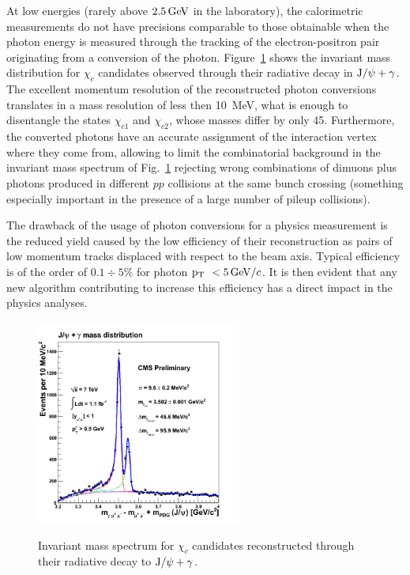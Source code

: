 \documentclass[a4paper]{jpconf}
\def \Chione {\chi_{c1}}
\def \Chitwo {\chi_{c2}}
\def \JPsi{\rm J/\psi}
\def \cPgg{\gamma}
\def \pt{$\p_{\rm T}$~}
\begin{document}
At  low energies (rarely above 
$2.5{\rm \, GeV}$ in the laboratory), the calorimetric
measurements do not have precisions comparable to those obtainable
when the photon energy is measured through the tracking of the 
electron-positron pair originating from a conversion of the photon.
Figure~\ref{fig:chic} shows the invariant mass distribution for $\chi_c$ candidates
observed through their radiative decay in $\JPsi + \cPgg$. The excellent momentum resolution of the reconstructed photon conversions translates in a mass resolution of less then 10~MeV, what is enough to disentangle  the states $\Chione$ and $\Chitwo$, whose masses differ by only 45\MeV.
%
Furthermore, the  converted photons have an accurate assignment of the interaction vertex where they come from, allowing  to limit the combinatorial background in the invariant mass spectrum of Fig.~\ref{fig:chic}
rejecting wrong combinations of  dimuons  plus  photons produced in different $pp$ collisions at the same bunch crossing (something especially important in the
presence of a large number of pileup collisions). 


The drawback of the usage of photon conversions for a physics measurement 
is the reduced yield caused by the low efficiency of their reconstruction as pairs of low momentum tracks displaced with respect to the beam axis. Typical efficiency is of the order of $0.1 \div 5\%$ for photon \pt  $< 5 {\rm \, GeV}/c$. It is then evident that any new algorithm contributing to increase this efficiency has a direct impact in the physics analyses.





\begin{figure}[h]
  \begin{center}
    \includegraphics[width=0.6\textwidth]{fig/Chic1fb.png}
    \label{fig:chic}
   \caption{Invariant mass spectrum for $\chi_c$ candidates  reconstructed through their radiative decay to $\JPsi + \cPgg$.}
     \end{center}
\end{figure} 
\end{document}

